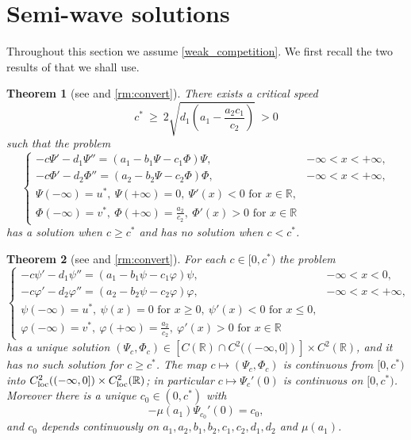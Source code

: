 \documentclass[reqno]{amsart}
\theoremstyle{plain}
\newtheorem{theorem}{Theorem}
\theoremstyle{definition}
\theoremstyle{remark}
\begin{document}
\section{Semi-wave solutions}\label{sec_5}

Throughout this section we assume \eqref{weak_competition}. We first recall the
two results of \cite{MR3986328} that we shall use.

\begin{theorem}[see {\cite[Proposition 1.4]{MR3986328}} and \cref{rm:convert}]\label{th:c*}
	There exists a critical speed
	\[
	c^*\ \ge\ 2\sqrt{d_1\left(a_1-\frac{a_2c_1}{c_2}\right)}\ >0
	\]
	such that the problem
	\begin{equation}\label{tw}
		\begin{cases}
			-c \Psi' - d_1 \Psi'' = (a_1 - b_1\Psi - c_1\Phi)\Psi, & -\infty < x < +\infty,\\
			-c \Phi' - d_2 \Phi'' = (a_2 - b_2\Psi - c_2\Phi)\Phi, & -\infty < x < +\infty,\\
			\Psi(-\infty) = u^*, ~ \Psi(+\infty)=0, ~ \Psi'(x)<0 \text{ for } x \in \mathbb{R},\\
			\Phi(-\infty) = v^*, ~ \Phi(+\infty)=\frac{a_2}{c_2}, ~ \Phi'(x)>0 \text{ for } x\in \mathbb{R}
		\end{cases}
	\end{equation}
	has a solution when $c\ge c^*$ and has no solution when $c<c^*$.
\end{theorem}

\begin{theorem}[see {\cite[Theorem 1.5]{MR3986328}} and \cref{rm:convert}]\label{th:semi-wave0}
	For each $c\in[0,c^*)$ the problem
	\begin{equation}\label{semiwave0}
		\begin{cases}
			-c \psi' - d_1 \psi'' = (a_1 - b_1\psi - c_1\varphi)\psi, & -\infty < x < 0,\\
			-c \varphi' - d_2 \varphi'' = (a_2 - b_2\psi - c_2\varphi)\varphi, & -\infty < x < +\infty,\\
			\psi(-\infty) = u^*, ~ \psi(x)=0 \text{ for } x\ge 0, ~ \psi'(x)<0 \text{ for } x\le 0,\\
			\varphi(-\infty) = v^*, ~ \varphi(+\infty)=\frac{a_2}{c_2}, ~ \varphi'(x)>0 \text{ for } x\in \mathbb{R}
		\end{cases}
	\end{equation}
	has a unique solution $(\Psi_c, \Phi_c) \in [C(\mathbb{R})\cap C^2((-\infty, 0])] \times C^2(\mathbb{R})$,
	and it has no such solution for $c\ge c^*$. The map
	$c\mapsto(\Psi_c,\Phi_c)$ is continuous from $[0,c^*)$ into
	$C^2_{\rm loc}((-\infty,0])\times C^2_{\rm loc}(\mathbb{R})$; in particular
	$c\mapsto\Psi_c'(0)$ is continuous on $[0,c^*)$. Moreover there is a unique
	$c_0\in(0,c^*)$ with
	\begin{equation}\label{c0}
		-\mu(a_1) \Psi_{c_0}'(0) = c_0 ,
	\end{equation}
	and $c_0$ depends continuously on $a_1,a_2,b_1,b_2,c_1,c_2,d_1,d_2$ and
	$\mu(a_1)$.
\end{theorem}
\end{document}
